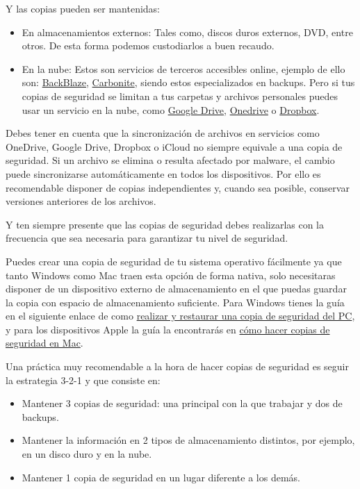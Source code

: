 \documentclass[
  spanish,
  a4paper,
  openany]{book}
\begin{document}
Y las copias pueden ser mantenidas:

\begin{itemize}
\item
  En almacenamientos externos: Tales como, discos duros externos, DVD, entre otros. De esta forma podemos custodiarlos a buen recaudo.
\item
  En la nube: Estos son servicios de terceros accesibles online, ejemplo de ello son: \href{https://www.backblaze.com/home-1.html}{BackBlaze}, \href{https://www.carbonite.com/}{Carbonite}, siendo estos especializados en backups. Pero si tus copias de seguridad se limitan a tus carpetas y archivos personales puedes usar un servicio en la nube, como \href{https://www.google.com/intl/en_in/drive/}{Google Drive}, \href{https://www.microsoft.com/en-us/microsoft-365/onedrive/online-cloud-storage}{Onedrive} o \href{https://www.dropbox.com/}{Dropbox}.
\end{itemize}

Debes tener en cuenta que la sincronización de archivos en servicios como OneDrive, Google Drive, Dropbox o iCloud no siempre equivale a una copia de seguridad. Si un archivo se elimina o resulta afectado por malware, el cambio puede sincronizarse automáticamente en todos los dispositivos. Por ello es recomendable disponer de copias independientes y, cuando sea posible, conservar versiones anteriores de los archivos.

Y ten siempre presente que las copias de seguridad debes realizarlas con la frecuencia que sea necesaria para garantizar tu nivel de seguridad.

Puedes crear una copia de seguridad de tu sistema operativo fácilmente ya que tanto Windows como Mac traen esta opción de forma nativa, solo necesitaras disponer de un dispositivo externo de almacenamiento en el que puedas guardar la copia con espacio de almacenamiento suficiente. Para Windows tienes la guía en el siguiente enlace de como \href{https://support.microsoft.com/es-es/windows/realizar-y-restaurar-una-copia-de-seguridad-del-pc-ac359b36-7015-4694-de9a-c5eac1ce9d9c}{realizar y restaurar una copia de seguridad del PC}, y para los dispositivos Apple la guía la encontrarás en \href{https://support.apple.com/es-es/mac-backup}{cómo hacer copias de seguridad en Mac}.

Una práctica muy recomendable a la hora de hacer copias de seguridad es seguir la estrategia 3-2-1 \citep{INCI-copia-3-2-1} y que consiste en:

\begin{itemize}
\item
  Mantener 3 copias de seguridad: una principal con la que trabajar y dos de backups.
\item
  Mantener la información en 2 tipos de almacenamiento distintos, por ejemplo, en un disco duro y en la nube.
\item
  Mantener 1 copia de seguridad en un lugar diferente a los demás.
\end{itemize}
\end{document}
